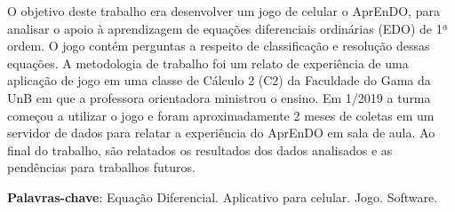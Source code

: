 \begin{resumo}
O objetivo deste trabalho era desenvolver um jogo de celular o AprEnDO, para analisar o
 apoio à aprendizagem de equações diferenciais ordinárias (EDO) de 1ª ordem.
 O jogo contém perguntas a respeito de classificação e resolução dessas equações. A metodologia
 de trabalho foi um relato de experiência de uma aplicação de jogo em uma classe de Cálculo 2 (C2) da Faculdade do Gama da UnB em que a professora orientadora ministrou o ensino. Em 1/2019 a turma começou a utilizar o jogo e foram aproximadamente 2 meses de coletas em um servidor de dados para relatar a experiência do AprEnDO em sala de aula. Ao final do trabalho, são relatados os resultados dos dados analisados e as pendências para trabalhos futuros.
	
\begin{comment}
 Com a qualidade de ensino de matemática baixa e contra os métodos muito
 tradicionais de ensino nas salas de aula, resolveu-se desenvolver um 
 aplicativo para celular (iOS e Android) que seja um jogo para o suporte de 
 ensino de equações diferenciais (ED). Será realizada uma pesquisa descritiva
 para o levantamento bibliográfico das características que deverão estar presentes
 no software para dar auxílio a alunos com TDAH junto de técnicas de gamificação 
 para tentar deixar o aprendizado mais prazeroso.
\end{comment}
  
 \begin{comment}
 O resumo deve ressaltar o objetivo, o método, os resultados e as conclusões 
 do documento. A ordem e a extensão
 destes itens dependem do tipo de resumo (informativo ou indicativo) e do
 tratamento que cada item recebe no documento original. O resumo deve ser
 precedido da referência do documento, com exceção do resumo inserido no
 próprio documento. (\ldots) As palavras-chave devem figurar logo abaixo do
 resumo, antecedidas da expressão Palavras-chave:, separadas entre si por
 ponto e finalizadas também por ponto. O texto pode conter no mínimo 150 e 
 no máximo 500 palavras, é aconselhável que sejam utilizadas 200 palavras. 
 E não se separa o texto do resumo em parágrafos.
 \end{comment}

 \vspace{\onelineskip}
    
 \noindent
 \textbf{Palavras-chave}: Equação Diferencial. Aplicativo para celular. Jogo. Software.
\end{resumo}
